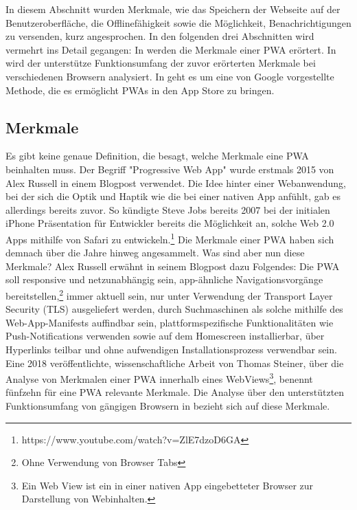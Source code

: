 In diesem Abschnitt wurden Merkmale, wie das Speichern der Webseite auf der Benutzeroberfläche,
die Offlinefähigkeit sowie die Möglichkeit, Benachrichtigungen zu versenden, kurz angesprochen.
In den folgenden drei Abschnitten wird vermehrt ins Detail gegangen: In 
werden die Merkmale einer PWA erörtert. In 
wird der unterstütze Funktionsumfang der zuvor erörterten Merkmale bei verschiedenen Browsern
analysiert. In  geht es um eine von Google vorgestellte Methode,
die es ermöglicht PWAs in den App Store zu bringen.

\subsection{Merkmale}
\label{subsec:markmale}
Es gibt keine genaue Definition, die besagt, welche Merkmale eine PWA beinhalten muss.
Der Begriff "Progressive Web App" wurde erstmals 2015 von Alex Russell in einem Blogpost
verwendet.\cite{PWA2015} Die Idee hinter einer Webanwendung, bei der sich die Optik und Haptik
wie die bei einer nativen App anfühlt, gab es allerdings bereits zuvor. So kündigte
Steve Jobs bereits 2007 bei der initialen iPhone Präsentation für Entwickler bereits die Möglichkeit
an, solche Web 2.0 Apps mithilfe von Safari zu entwickeln.\footnote{https://www.youtube.com/watch?v=ZlE7dzoD6GA}
Die Merkmale einer PWA haben sich demnach über die Jahre hinweg angesammelt. Was sind aber
nun diese Merkmale? Alex Russell erwähnt in seinem Blogpost dazu Folgendes:
Die PWA soll responsive und netzunabhängig sein, app-ähnliche Navigationsvorgänge bereitstellen,\footnote{Ohne Verwendung von Browser Tabs} 
immer aktuell sein, nur unter Verwendung der Transport Layer Security (TLS) ausgeliefert werden, durch Suchmaschinen als solche mithilfe
des Web-App-Manifests auffindbar sein, plattformspezifische Funktionalitäten wie Push-Notifications
verwenden sowie auf dem Homescreen installierbar, über Hyperlinks teilbar und ohne aufwendigen
Installationsprozess verwendbar sein.\cite{PWA2015} Eine 2018 veröffentlichte, wissenschaftliche
Arbeit von Thomas Steiner, über die Analyse von Merkmalen einer PWA innerhalb eines WebViews\footnote{Ein Web View ist ein in einer nativen App eingebetteter Browser zur Darstellung von Webinhalten.},
benennt fünfzehn für eine PWA relevante Merkmale. Die Analyse über den unterstützten Funktionsumfang
von gängigen Browsern in 
bezieht sich auf diese Merkmale.\cite{WhatIsInAWebView}

